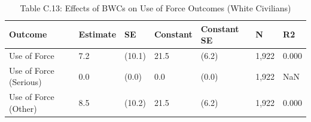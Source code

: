 \begin{table}

\caption{Table C.13: Effects of BWCs on Use of Force Outcomes (White Civilians)}
\centering
\begin{tabular}[t]{lllllll}
\toprule
Outcome & Estimate & SE & Constant & Constant SE & N & R2\\
\midrule
Use of Force & 7.2 & (10.1) & 21.5 & (6.2) & 1,922 & 0.000\\
Use of Force (Serious) & 0.0 & (0.0) & 0.0 & (0.0) & 1,922 & NaN\\
Use of Force (Other) & 8.5 & (10.2) & 21.5 & (6.2) & 1,922 & 0.000\\
\bottomrule
\end{tabular}
\end{table}
